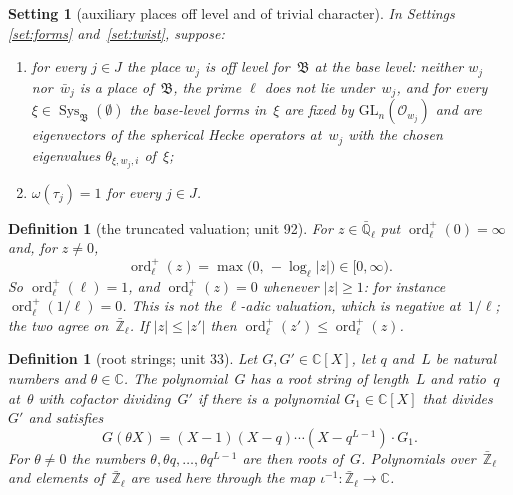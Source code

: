 \documentclass[11pt,a4paper]{article}
\newcommand{\kw}[1]{\emph{#1}}
\newcommand{\m}[1]{\mbox{$#1$}}        %
\theoremstyle{plainx}
\theoremstyle{uprightx}
\newtheorem{definition}[theorem]{Definition}
\newtheorem{setting}[theorem]{Setting}          %
\newcommand{\CC}{\mathbb{C}}
\newcommand{\Zl}{\bar{\mathbb{Z}}_\ell}
\newcommand{\Ql}{\bar{\mathbb{Q}}_\ell}
\newcommand{\Ow}[1]{\mathcal{O}_{#1}}
\newcommand{\GL}{\mathrm{GL}}
\newcommand{\Sys}{\operatorname{Sys}}
\newcommand{\ordp}{\operatorname{ord}^{+}_{\ell}}
\newcommand{\fB}{\mathfrak{B}}
\begin{document}
\begin{setting}[auxiliary places off level and of trivial character]\label{set:aux}
In Settings \ref{set:forms} and~\ref{set:twist}, suppose:
\begin{enumerate}[label=\textup{(\alph*)},leftmargin=2.3em,itemsep=2pt]
\item for every \m{j\in J} the place $w_j$ is \kw{off level} for~$\fB$ at the base level: neither $w_j$
nor~$\bar w_j$ is a place of~$\fB$, the prime $\ell$ does not lie under~$w_j$, and for every
\m{\xi\in\Sys_{\fB}(\emptyset)} the base-level forms in~$\xi$ are fixed by \m{\GL_n(\Ow{w_j})} and are eigenvectors
of the spherical Hecke operators at~$w_j$ with the chosen eigenvalues \m{\theta_{\xi,w_j,i}} of~$\xi$;
\item \m{\omega(\tau_j)=1} for every \m{j\in J}.
\end{enumerate}
\end{setting}

\begin{definition}[the truncated valuation; unit 92]\label{d:ord}
For \m{z\in\Ql} put \m{\ordp(0)=\infty} and, for \m{z\ne0},
\[\ordp(z)=\max\bigl(0,\,-\log_\ell|z|\bigr)\in[0,\infty).\]
So \m{\ordp(\ell)=1}, and \m{\ordp(z)=0} whenever \m{|z|\ge1}: for instance \m{\ordp(1/\ell)=0}. This is not the
$\ell$-adic valuation, which is negative at~$1/\ell$; the two agree on~$\Zl$. If \m{|z|\le|z'|} then
\m{\ordp(z')\le\ordp(z)}.
\end{definition}

\begin{definition}[root strings; unit 33]\label{d:string}
Let \m{G,G'\in\CC[X]}, let $q$ and~$L$ be natural numbers and \m{\theta\in\CC}. The polynomial~$G$ \kw{has a root
string of length~$L$ and ratio~$q$ at~$\theta$ with cofactor dividing~$G'$} if there is a polynomial
\m{G_1\in\CC[X]} that divides~$G'$ and satisfies
\[G(\theta X)=(X-1)(X-q)\cdots(X-q^{L-1})\cdot G_1.\]
For \m{\theta\ne0} the numbers \m{\theta,\theta q,\dots,\theta q^{L-1}} are then roots of~$G$. Polynomials over~$\Zl$
and elements of~$\Zl$ are used here through the map \m{\iota^{-1}\colon\Zl\to\CC}.
\end{definition}
\end{document}
